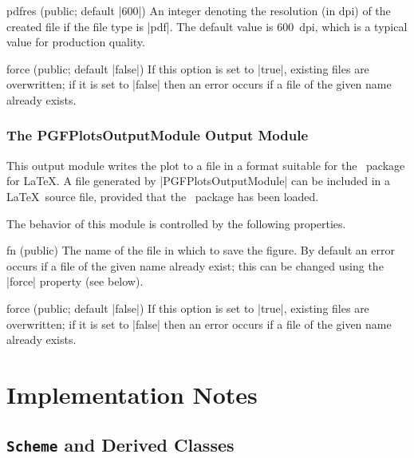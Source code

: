 \begin{property}{pdfres (public; default |600|)}
  An integer denoting the resolution (in dpi) of the
  created file if the file type is |pdf|. The default value is 600~dpi, which
  is a typical value for production quality.
\end{property}

\begin{property}{force (public; default |false|)}
   If this option is set to |true|, existing files are overwritten; if it is set
   to |false| then an error occurs if a file of the given name already exists.
\end{property}


\subsubsection{The PGFPlotsOutputModule Output Module}

This output module writes the plot to a file in a format suitable for the
\pgfplots\ package for \LaTeX. A file generated by |PGFPlotsOutputModule| can be
included in a \LaTeX\ source file, provided that the \pgfplots\ package has been
loaded. 

The behavior of this module is controlled by the following properties.
\begin{property}{fn (public)}
  The name of the file in which to save the figure. By
  default an error occurs if a file of the given name already exist; this can
  be changed using the |force| property (see below).
\end{property}

\begin{property}{force (public; default |false|)}
   If this option is set to |true|, existing files are
  overwritten; if it is set to |false| then an error occurs if a file of the
  given name already exists.
\end{property}


%
%
%


\section{Implementation Notes}

\subsection{\texttt{Scheme} and Derived Classes}

